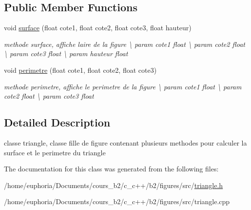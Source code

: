 \subsection*{Public Member Functions}
\begin{DoxyCompactItemize}
\item 
void \hyperlink{classtriangle_ad901747ecf12bd9306efe6b96edb7283}{surface} (float cote1, float cote2, float cote3, float hauteur)\hypertarget{classtriangle_ad901747ecf12bd9306efe6b96edb7283}{}\label{classtriangle_ad901747ecf12bd9306efe6b96edb7283}

\begin{DoxyCompactList}\small\item\em methode surface, affiche l\textquotesingle{}aire de la figure \textbackslash{} param cote1 float \textbackslash{} param cote2 float \textbackslash{} param cote3 float \textbackslash{} param hauteur float \end{DoxyCompactList}\item 
void \hyperlink{classtriangle_a079d90208145fc5cb3f016b42b0ae69d}{perimetre} (float cote1, float cote2, float cote3)\hypertarget{classtriangle_a079d90208145fc5cb3f016b42b0ae69d}{}\label{classtriangle_a079d90208145fc5cb3f016b42b0ae69d}

\begin{DoxyCompactList}\small\item\em methode perimetre, affiche le perimetre de la figure \textbackslash{} param cote1 float \textbackslash{} param cote2 float \textbackslash{} param cote3 float \end{DoxyCompactList}\end{DoxyCompactItemize}


\subsection{Detailed Description}
classe triangle, classe fille de figure contenant plusieurs methodes pour calculer la surface et le perimetre du triangle 

The documentation for this class was generated from the following files\+:\begin{DoxyCompactItemize}
\item 
/home/euphoria/\+Documents/cours\+\_\+b2/c\+\_\+c++/b2/figures/src/\hyperlink{triangle_8h}{triangle.\+h}\item 
/home/euphoria/\+Documents/cours\+\_\+b2/c\+\_\+c++/b2/figures/src/triangle.\+cpp\end{DoxyCompactItemize}
